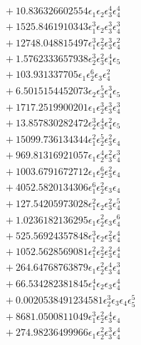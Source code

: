 \documentclass[10pt]{article}
\begin{document}
\begin{align*}
&{}  + 10.836326602554 \epsilon_{1} \epsilon_{2} \epsilon_{3}^{4} \epsilon_{4}^{4} \\
&{}  + 1525.8461910343 \epsilon_{1}^{3} \epsilon_{2} \epsilon_{3}^{3} \epsilon_{4}^{3} \\
&{}  + 12748.048815497 \epsilon_{1}^{3} \epsilon_{2}^{2} \epsilon_{3}^{3} \epsilon_{4}^{2} \\
&{}  + 1.5762333657938 \epsilon_{2}^{3} \epsilon_{3}^{2} \epsilon_{4}^{4} \epsilon_{5} \\
&{}  + 103.931337705 \epsilon_{1} \epsilon_{2}^{6} \epsilon_{3} \epsilon_{4}^{2} \\
&{}  + 6.5015154452073 \epsilon_{2} \epsilon_{3}^{5} \epsilon_{4}^{3} \epsilon_{5} \\
&{}  + 1717.2519900201 \epsilon_{1} \epsilon_{2}^{3} \epsilon_{3}^{3} \epsilon_{4}^{3} \\
&{}  + 13.857830282472 \epsilon_{2}^{3} \epsilon_{3}^{4} \epsilon_{4}^{2} \epsilon_{5} \\
&{}  + 15099.736134344 \epsilon_{1}^{2} \epsilon_{2}^{5} \epsilon_{3}^{2} \epsilon_{4} \\
&{}  + 969.81316921057 \epsilon_{1} \epsilon_{2}^{4} \epsilon_{3}^{2} \epsilon_{4}^{3} \\
&{}  + 1003.6791672712 \epsilon_{1} \epsilon_{2}^{6} \epsilon_{3}^{2} \epsilon_{4} \\
&{}  + 4052.5820134306 \epsilon_{1}^{6} \epsilon_{2}^{2} \epsilon_{3} \epsilon_{4} \\
&{}  + 127.54205973028 \epsilon_{1}^{2} \epsilon_{2} \epsilon_{3}^{2} \epsilon_{4}^{5} \\
&{}  + 1.0236182136295 \epsilon_{1} \epsilon_{2}^{2} \epsilon_{3} \epsilon_{4}^{6} \\
&{}  + 525.56924357848 \epsilon_{1}^{3} \epsilon_{2} \epsilon_{3}^{2} \epsilon_{4}^{4} \\
&{}  + 1052.5628569081 \epsilon_{1}^{2} \epsilon_{2}^{2} \epsilon_{3}^{2} \epsilon_{4}^{4} \\
&{}  + 264.64768763879 \epsilon_{1} \epsilon_{2}^{2} \epsilon_{3}^{4} \epsilon_{4}^{3} \\
&{}  + 66.534282381845 \epsilon_{1}^{4} \epsilon_{2} \epsilon_{3} \epsilon_{4}^{4} \\
&{}  + 0.0020538491234581 \epsilon_{2}^{3} \epsilon_{3} \epsilon_{4} \epsilon_{5}^{5} \\
&{}  + 8681.0500811049 \epsilon_{1}^{3} \epsilon_{2}^{2} \epsilon_{3}^{4} \epsilon_{4} \\
&{}  + 274.98236499966 \epsilon_{1} \epsilon_{2}^{2} \epsilon_{3}^{3} \epsilon_{4}^{4} \\

\end{align*}
\end{document}
